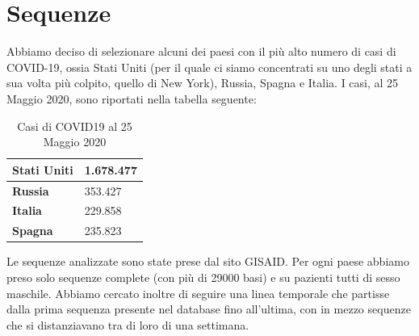 \documentclass[a4paper,10pt]{article}
\begin{document}
\section{Sequenze}
Abbiamo deciso di selezionare alcuni dei paesi con il più alto numero di casi di COVID-19, ossia Stati Uniti (per il quale ci siamo concentrati su uno degli stati a sua volta più colpito, quello di New York), Russia,  Spagna e Italia. I casi, al 25 Maggio 2020, sono riportati nella tabella seguente:

\begin{table}[H]
\centering
\begin{tabular}{|l|l|}
\hline
\textbf{Stati Uniti} & 1.678.477 \\ \hline
\textbf{Russia}      & 353.427   \\ \hline
\textbf{Italia}      & 229.858   \\ \hline
\textbf{Spagna}      & 235.823   \\ \hline
\end{tabular}
\caption{Casi di COVID19 al 25 Maggio 2020}
\end{table}

Le sequenze analizzate sono state prese dal sito GISAID. Per ogni paese abbiamo preso solo sequenze complete (con più di 29000 basi) e su pazienti tutti di sesso maschile. Abbiamo cercato inoltre di seguire una linea temporale che partisse dalla prima sequenza presente nel database fino all'ultima, con in mezzo sequenze che si distanziavano tra di loro di una settimana.
\end{document}
